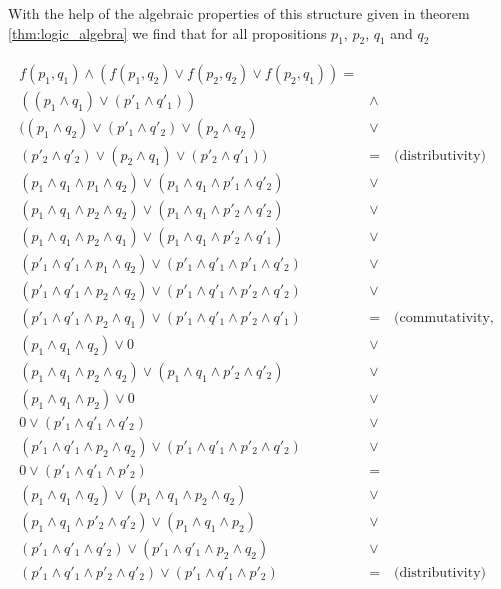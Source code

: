 With the help of the algebraic properties of this structure given in theorem \ref{thm:logic_algebra} we find that for all propositions $p_1$, $p_2$, $q_1$ and $q_2$

\begin{align}
\begin{split}
f(p_1,q_1)\wedge (f(p_1,q_2)\vee f(p_2,q_2)\vee f(p_2,q_1)) = \\
((p_1\wedge q_1)\vee (p'_1 \wedge q'_1))&\wedge \\ \nonumber
((p_1\wedge q_2)\vee (p'_1 \wedge q'_2)\vee(p_2\wedge q_2) &\vee \\ 
(p'_2 \wedge q'_2)\vee(p_2\wedge q_1)\vee (p'_2 \wedge q'_1))& = \quad\text{(distributivity)}  \\ 
(p_1\wedge q_1\wedge  p_1\wedge q_2)\vee (p_1\wedge q_1\wedge  p'_1 \wedge q'_2)&\vee \\
(p_1\wedge q_1\wedge  p_2\wedge q_2)\vee (p_1\wedge q_1\wedge  p'_2 \wedge q'_2)&\vee \\
(p_1\wedge q_1\wedge  p_2\wedge q_1)\vee (p_1\wedge q_1\wedge  p'_2 \wedge q'_1)&\vee \\
(p'_1\wedge q'_1\wedge  p_1\wedge q_2)\vee (p'_1\wedge q'_1\wedge  p'_1 \wedge q'_2)&\vee \\
(p'_1\wedge q'_1\wedge  p_2\wedge q_2)\vee (p'_1\wedge q'_1\wedge  p'_2 \wedge q'_2)&\vee \\
(p'_1\wedge q'_1\wedge  p_2\wedge q_1)\vee (p'_1\wedge q'_1\wedge  p'_2 \wedge q'_1)&= \quad\text{(commutativity, idempotency, complements)}\\
(p_1\wedge q_1 \wedge q_2)\vee 0 & \vee \\
(p_1\wedge q_1\wedge  p_2\wedge q_2)\vee (p_1\wedge q_1\wedge  p'_2 \wedge q'_2)&\vee \\
(p_1\wedge q_1\wedge  p_2)\vee 0 & \vee \\
0\vee (p'_1\wedge q'_1 \wedge q'_2) & \vee \\
(p'_1\wedge q'_1\wedge  p_2\wedge q_2)\vee (p'_1\wedge q'_1\wedge  p'_2 \wedge q'_2) & \vee\\
0\vee (p'_1\wedge q'_1\wedge  p'_2 )&=  \\ 
(p_1\wedge q_1 \wedge q_2)\vee(p_1\wedge q_1\wedge  p_2\wedge q_2)&\vee\nonumber \\
(p_1\wedge q_1\wedge  p'_2 \wedge q'_2)\vee (p_1\wedge q_1\wedge  p_2)&\vee \\
(p'_1\wedge q'_1 \wedge q'_2)\vee (p'_1\wedge q'_1\wedge  p_2\wedge q_2)&\vee \\
(p'_1\wedge q'_1\wedge  p'_2 \wedge q'_2)\vee (p'_1\wedge q'_1\wedge  p'_2 )&= \quad\text{(distributivity)} \\

\end{split}
\end{align}

